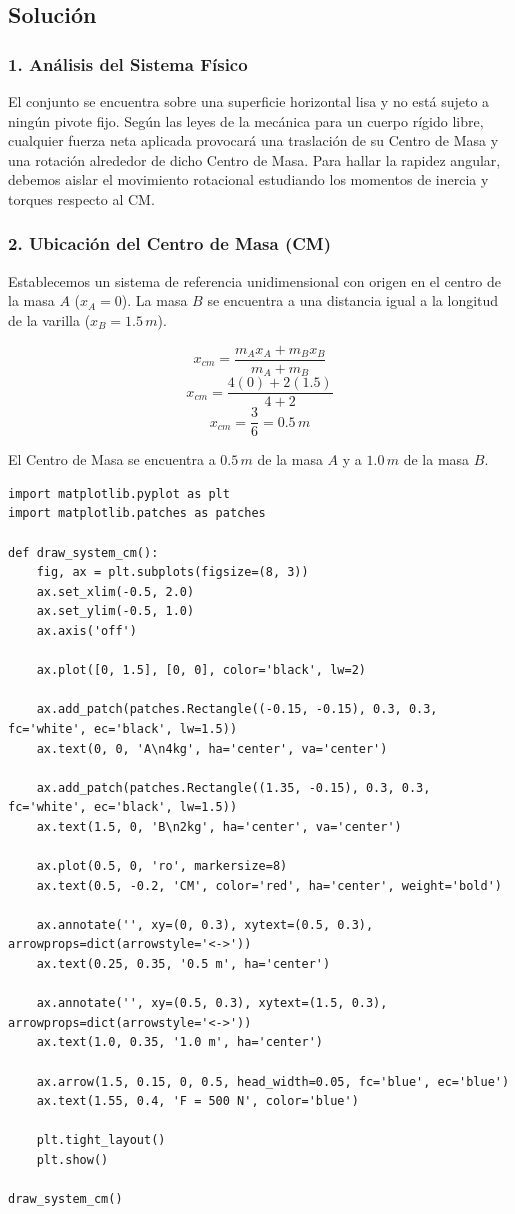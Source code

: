 \documentclass[12pt, a4paper]{article}
\begin{document}
\subsection*{Solución}

\subsubsection*{1. Análisis del Sistema Físico}
El conjunto se encuentra sobre una superficie horizontal lisa y no está sujeto a ningún pivote fijo. Según las leyes de la mecánica para un cuerpo rígido libre, cualquier fuerza neta aplicada provocará una traslación de su Centro de Masa y una rotación alrededor de dicho Centro de Masa. Para hallar la rapidez angular, debemos aislar el movimiento rotacional estudiando los momentos de inercia y torques respecto al CM.

\subsubsection*{2. Ubicación del Centro de Masa (CM)}
Establecemos un sistema de referencia unidimensional con origen en el centro de la masa $A$ ($x_A = 0$). La masa $B$ se encuentra a una distancia igual a la longitud de la varilla ($x_B = 1.5 \, \si{m}$).

$$x_{cm} = \frac{m_A x_A + m_B x_B}{m_A + m_B}$$
$$x_{cm} = \frac{4(0) + 2(1.5)}{4 + 2}$$
$$x_{cm} = \frac{3}{6} = 0.5 \, \si{m}$$

El Centro de Masa se encuentra a $0.5 \, \si{m}$ de la masa $A$ y a $1.0 \, \si{m}$ de la masa $B$.

\begin{lstlisting}
import matplotlib.pyplot as plt
import matplotlib.patches as patches

def draw_system_cm():
    fig, ax = plt.subplots(figsize=(8, 3))
    ax.set_xlim(-0.5, 2.0)
    ax.set_ylim(-0.5, 1.0)
    ax.axis('off')
    
    ax.plot([0, 1.5], [0, 0], color='black', lw=2)
    
    ax.add_patch(patches.Rectangle((-0.15, -0.15), 0.3, 0.3, fc='white', ec='black', lw=1.5))
    ax.text(0, 0, 'A\n4kg', ha='center', va='center')
    
    ax.add_patch(patches.Rectangle((1.35, -0.15), 0.3, 0.3, fc='white', ec='black', lw=1.5))
    ax.text(1.5, 0, 'B\n2kg', ha='center', va='center')
    
    ax.plot(0.5, 0, 'ro', markersize=8)
    ax.text(0.5, -0.2, 'CM', color='red', ha='center', weight='bold')
    
    ax.annotate('', xy=(0, 0.3), xytext=(0.5, 0.3), arrowprops=dict(arrowstyle='<->'))
    ax.text(0.25, 0.35, '0.5 m', ha='center')
    
    ax.annotate('', xy=(0.5, 0.3), xytext=(1.5, 0.3), arrowprops=dict(arrowstyle='<->'))
    ax.text(1.0, 0.35, '1.0 m', ha='center')
    
    ax.arrow(1.5, 0.15, 0, 0.5, head_width=0.05, fc='blue', ec='blue')
    ax.text(1.55, 0.4, 'F = 500 N', color='blue')
    
    plt.tight_layout()
    plt.show()

draw_system_cm()
\end{lstlisting}
\end{document}
